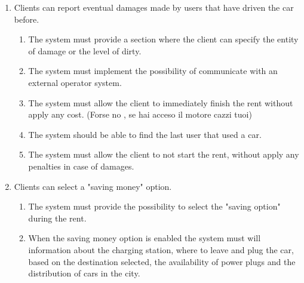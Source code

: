 \begin{enumerate}
\item Clients can report eventual damages made by users that have driven the car before.
\begin{enumerate}
\item The system must provide a section where the client can specify the entity of damage or the level of dirty.
\item The system must implement the possibility of communicate with an external operator system.
\item The system must allow the client to immediately finish the rent without apply any cost. (Forse no , se hai acceso il motore cazzi tuoi)
\item The system should be able to find the last user that used a car.
\item The system must allow the client to not start the rent, without apply any penalties in case of damages.
\end{enumerate}

\item Clients can select a "saving money" option.
\begin{enumerate}
\item The system must provide the possibility to select the "saving option" during the rent.
\item When the saving money option is enabled the system must will information about the charging station, where to leave and plug the car, based on the destination selected, the availability of power plugs and the distribution of cars in the city.
\end{enumerate}
\end{enumerate}